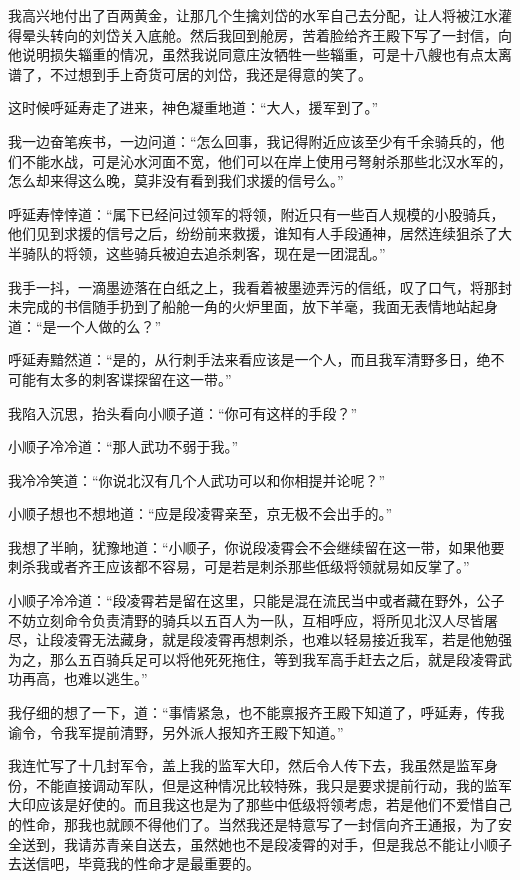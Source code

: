 我高兴地付出了百两黄金，让那几个生擒刘岱的水军自己去分配，让人将被江水灌得晕头转向的刘岱关入底舱。然后我回到舱房，苦着脸给齐王殿下写了一封信，向他说明损失辎重的情况，虽然我说同意庄汝牺牲一些辎重，可是十八艘也有点太离谱了，不过想到手上奇货可居的刘岱，我还是得意的笑了。

这时候呼延寿走了进来，神色凝重地道：“大人，援军到了。”

我一边奋笔疾书，一边问道：“怎么回事，我记得附近应该至少有千余骑兵的，他们不能水战，可是沁水河面不宽，他们可以在岸上使用弓弩射杀那些北汉水军的，怎么却来得这么晚，莫非没有看到我们求援的信号么。”

呼延寿悻悻道：“属下已经问过领军的将领，附近只有一些百人规模的小股骑兵，他们见到求援的信号之后，纷纷前来救援，谁知有人手段通神，居然连续狙杀了大半骑队的将领，这些骑兵被迫去追杀刺客，现在是一团混乱。”

我手一抖，一滴墨迹落在白纸之上，我看着被墨迹弄污的信纸，叹了口气，将那封未完成的书信随手扔到了船舱一角的火炉里面，放下羊毫，我面无表情地站起身道：“是一个人做的么？”

呼延寿黯然道：“是的，从行刺手法来看应该是一个人，而且我军清野多日，绝不可能有太多的刺客谍探留在这一带。”

我陷入沉思，抬头看向小顺子道：“你可有这样的手段？”

小顺子冷冷道：“那人武功不弱于我。”

我冷冷笑道：“你说北汉有几个人武功可以和你相提并论呢？”

小顺子想也不想地道：“应是段凌霄亲至，京无极不会出手的。”

我想了半晌，犹豫地道：“小顺子，你说段凌霄会不会继续留在这一带，如果他要刺杀我或者齐王应该都不容易，可是若是刺杀那些低级将领就易如反掌了。”

小顺子冷冷道：“段凌霄若是留在这里，只能是混在流民当中或者藏在野外，公子不妨立刻命令负责清野的骑兵以五百人为一队，互相呼应，将所见北汉人尽皆屠尽，让段凌霄无法藏身，就是段凌霄再想刺杀，也难以轻易接近我军，若是他勉强为之，那么五百骑兵足可以将他死死拖住，等到我军高手赶去之后，就是段凌霄武功再高，也难以逃生。”

我仔细的想了一下，道：“事情紧急，也不能禀报齐王殿下知道了，呼延寿，传我谕令，令我军提前清野，另外派人报知齐王殿下知道。”

我连忙写了十几封军令，盖上我的监军大印，然后令人传下去，我虽然是监军身份，不能直接调动军队，但是这种情况比较特殊，我只是要求提前行动，我的监军大印应该是好使的。而且我这也是为了那些中低级将领考虑，若是他们不爱惜自己的性命，那我也就顾不得他们了。当然我还是特意写了一封信向齐王通报，为了安全送到，我请苏青亲自送去，虽然她也不是段凌霄的对手，但是我总不能让小顺子去送信吧，毕竟我的性命才是最重要的。

